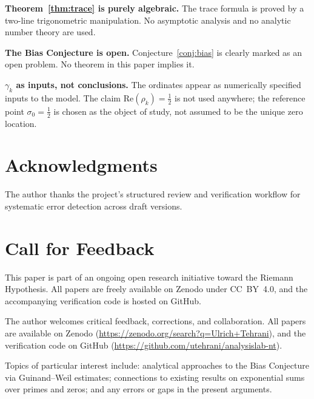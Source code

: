 \documentclass[11pt]{article}
\begin{document}
\textbf{Theorem~\ref{thm:trace} is purely algebraic.}
The trace formula is proved by a two-line trigonometric manipulation.
No asymptotic analysis and no analytic number theory are used.

\textbf{The Bias Conjecture is open.}
Conjecture~\ref{conj:bias} is clearly marked as an open problem.
No theorem in this paper implies it.

\textbf{$\gamma_k$ as inputs, not conclusions.}
The ordinates appear as numerically specified inputs to the model.
The claim $\mathrm{Re}(\rho_k)=\tfrac{1}{2}$ is not used anywhere;
the reference point $\sigma_0=\tfrac{1}{2}$ is chosen as the object
of study, not assumed to be the unique zero location.

\section*{Acknowledgments}

The author thanks the project's structured review and verification
workflow for systematic error detection across draft versions.

\section*{Call for Feedback}

This paper is part of an ongoing open research initiative toward the
Riemann Hypothesis.
All papers are freely available on Zenodo under CC~BY~4.0,
and the accompanying verification code is hosted on GitHub.

The author welcomes critical feedback, corrections, and collaboration.
All papers are available on Zenodo
(\url{https://zenodo.org/search?q=Ulrich+Tehrani}),
and the verification code on GitHub
(\url{https://github.com/utehrani/analysislab-nt}).

Topics of particular interest include: analytical approaches to the
Bias Conjecture via Guinand--Weil estimates; connections to existing
results on exponential sums over primes and zeros; and any errors or
gaps in the present arguments.
\end{document}
